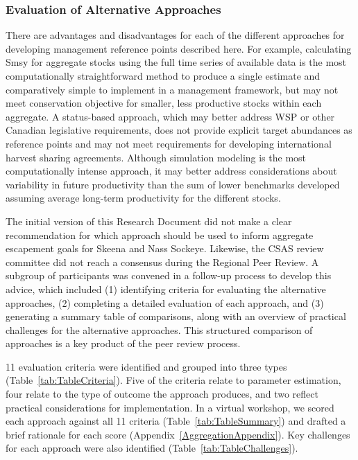 \documentclass[french,11pt]{book}
\begin{document}
\endgroup{} \endgroup{}

\clearpage

\subsubsection{Evaluation of Alternative Approaches}\label{evaluation-of-alternative-approaches}

There are advantages and disadvantages for each of the different approaches for developing management reference points described here. For example, calculating Smsy for aggregate stocks using the full time series of available data is the most computationally straightforward method to produce a single estimate and comparatively simple to implement in a management framework, but may not meet conservation objective for smaller, less productive stocks within each aggregate. A status-based approach, which may better address WSP or other Canadian legislative requirements, does not provide explicit target abundances as reference points and may not meet requirements for developing international harvest sharing agreements. Although simulation modeling is the most computationally intense approach, it may better address considerations about variability in future productivity than the sum of lower benchmarks developed assuming average long-term productivity for the different stocks.

The initial version of this Research Document did not make a clear recommendation for which approach should be used to inform aggregate escapement goals for Skeena and Nass Sockeye. Likewise, the CSAS review committee did not reach a consensus during the Regional Peer Review. A subgroup of participants was convened in a follow-up process to develop this advice, which included (1) identifying criteria for evaluating the alternative approaches, (2) completing a detailed evaluation of each approach, and (3) generating a summary table of comparisons, along with an overview of practical challenges for the alternative approaches. This structured comparison of approaches is a key product of the peer review process.

11 evaluation criteria were identified and grouped into three types (Table~\ref{tab:TableCriteria}). Five of the criteria relate to parameter estimation, four relate to the type of outcome the approach produces, and two reflect practical considerations for implementation. In a virtual workshop, we scored each approach against all 11 criteria (Table~\ref{tab:TableSummary}) and drafted a brief rationale for each score (Appendix~\ref{AggregationAppendix}). Key challenges for each approach were also identified (Table~\ref{tab:TableChallenges}).
\end{document}
